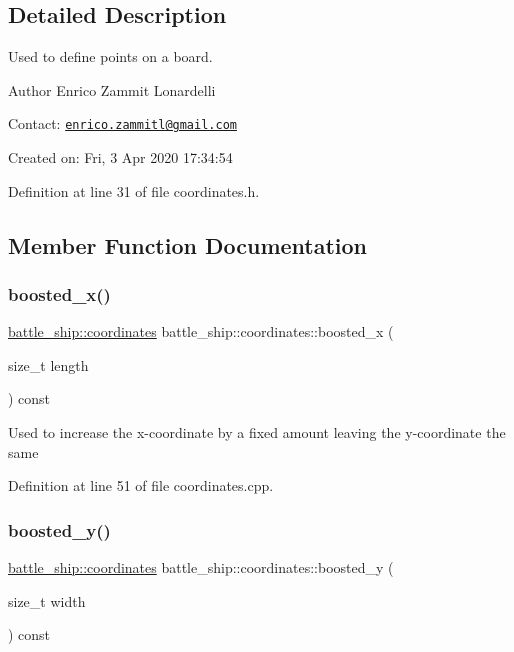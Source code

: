 \subsection{Detailed Description}
Used to define points on a board. 

\begin{DoxyAuthor}{Author}
Enrico Zammit Lonardelli
\end{DoxyAuthor}
Contact\+: \href{mailto:enrico.zammitl@gmail.com}{\tt enrico.\+zammitl@gmail.\+com}

Created on\+: Fri, 3 Apr 2020 17\+:34\+:54 

Definition at line 31 of file coordinates.\+h.



\subsection{Member Function Documentation}
\mbox{\label{structbattle__ship_1_1coordinates_ab72dd07aa255aef070909f3070786680}} 
\subsubsection{\texorpdfstring{boosted\+\_\+x()}{boosted\_x()}}
{\footnotesize\ttfamily \hyperlink{structbattle__ship_1_1coordinates}{battle\+\_\+ship\+::coordinates} battle\+\_\+ship\+::coordinates\+::boosted\+\_\+x (\begin{DoxyParamCaption}\item[{size\+\_\+t}]{length }\end{DoxyParamCaption}) const}

Used to increase the x-\/coordinate by a fixed amount leaving the y-\/coordinate the same 

Definition at line 51 of file coordinates.\+cpp.

\mbox{\label{structbattle__ship_1_1coordinates_ae09ab4c8792c9f91159dcf11071d6717}} 
\subsubsection{\texorpdfstring{boosted\+\_\+y()}{boosted\_y()}}
{\footnotesize\ttfamily \hyperlink{structbattle__ship_1_1coordinates}{battle\+\_\+ship\+::coordinates} battle\+\_\+ship\+::coordinates\+::boosted\+\_\+y (\begin{DoxyParamCaption}\item[{size\+\_\+t}]{width }\end{DoxyParamCaption}) const}

